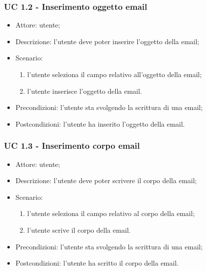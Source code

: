     \subsubsection{UC 1.2 - Inserimento oggetto email} \label{sec: UC 1.2}
    \begin{itemize}
        \item Attore: utente;
        \item Descrizione: l'utente deve poter inserire l'oggetto della email;
        \item Scenario:
        \begin{enumerate}
        \item l'utente seleziona il campo relativo all'oggetto della email;
        \item l'utente inserisce l'oggetto della email.
        \end{enumerate}
        \item Precondizioni: l'utente sta svolgendo la scrittura di una email;
        \item Postcondizioni: l'utente ha inserito l'oggetto della email.
    \end{itemize}
    
    \subsubsection{UC 1.3 - Inserimento corpo email} \label{sec: UC 1.3}
    \begin{itemize}
        \item Attore: utente;
        \item Descrizione: l'utente deve poter scrivere il corpo della email;
        \item Scenario:
        \begin{enumerate}
        \item l'utente seleziona il campo relativo al corpo della email;
        \item l'utente scrive il corpo della email.
        \end{enumerate}
        \item Precondizioni: l'utente sta svolgendo la scrittura di una email;
        \item Postcondizioni: l'utente ha scritto il corpo della email.
    \end{itemize}

